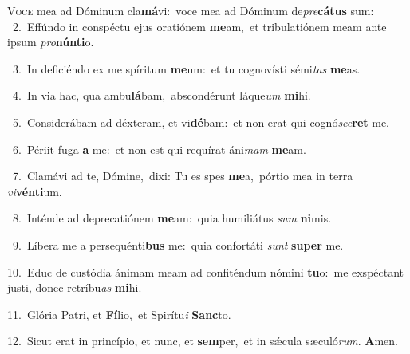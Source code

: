 \lettrine{\initial\textcolor{\initialcolor}{V}}{oce} mea ad Dóminum cla\-\textbf{má}\-vi:~\star voce mea ad Dóminum de\-\textit{pre}\-\textbf{cá}\textbf{tus} sum:\\
{\numbfont\textcolor{\numbcolor}{~2.}}~Effúndo in conspéctu ejus oratiónem \textbf{me}\-am,~\star et tribulatiónem meam ante ipsum \textit{pro}\-\textbf{nún}\textbf{ti}o.\par
{\numbfont\textcolor{\numbcolor}{~3.}}~In deficiéndo ex me spíritum \textbf{me}\-um:~\star et tu cognovísti sémi\textit{tas} \textbf{me}\-as.\par
{\numbfont\textcolor{\numbcolor}{~4.}}~In via hac, qua ambu\-\textbf{lá}\-bam,~\star abscondérunt láque\textit{um} \textbf{mi}\-hi.\par
{\numbfont\textcolor{\numbcolor}{~5.}}~Considerábam ad déxteram, et vi\-\textbf{dé}\-bam:~\star et non erat qui cognó\-\textit{sce}\-\textbf{ret} me.\par
{\numbfont\textcolor{\numbcolor}{~6.}}~Périit fuga \textbf{a} me:~\star et non est qui requírat áni\textit{mam} \textbf{me}\-am.\par
{\numbfont\textcolor{\numbcolor}{~7.}}~Clamávi ad te, Dómine,~\dagger dixi: Tu es spes \textbf{me}\-a,~\star pórtio mea in terra \textit{vi}\-\textbf{vén}\textbf{ti}um.\par
{\numbfont\textcolor{\numbcolor}{~8.}}~Inténde ad deprecatiónem \textbf{me}\-am:~\star quia humiliátus \textit{sum} \textbf{ni}\-mis.\par
{\numbfont\textcolor{\numbcolor}{~9.}}~Líbera me a persequénti\textbf{bus} me:~\star quia confortáti \textit{sunt} \textbf{su}\-\textbf{per} me.\par
{\numbfont\textcolor{\numbcolor}{10.}}~Educ de custódia ánimam meam ad confiténdum nómini \textbf{tu}\-o:~\star me exspéctant justi, donec retríbu\textit{as} \textbf{mi}\-hi.\par
{\numbfont\textcolor{\numbcolor}{11.}}~Glória Patri, et \textbf{Fí}\-lio,~\star et Spirítu\textit{i} \textbf{Sanc}\-to.\par
{\numbfont\textcolor{\numbcolor}{12.}}~Sicut erat in princípio, et nunc, et \textbf{sem}\-per,~\star et in sǽcula sæculó\-\textit{rum}\-. \textbf{A}\-men.\par
